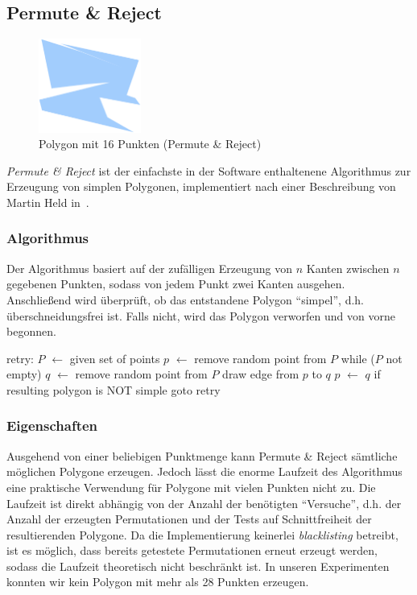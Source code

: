 \subsection{Permute \& Reject}

  \begin{figure}[h]
    \begin{center}
      \includegraphics[width=0.3\textwidth]{img/permute16.eps}
    \end{center}
    \caption{Polygon mit 16 Punkten (Permute \& Reject)}
    \label{fig:permute16}
  \end{figure}

  \emph{Permute \& Reject} ist der einfachste in der Software enthaltenene
  Algorithmus zur Erzeugung von simplen Polygonen, implementiert nach einer
  Beschreibung von Martin Held in~\cite{held98polygons}.

  \subsubsection{Algorithmus}

    Der Algorithmus basiert auf der zufälligen Erzeugung von $n$ Kanten zwischen
    $n$ gegebenen Punkten, sodass von jedem Punkt zwei Kanten ausgehen.
    Anschließend wird überprüft, ob das entstandene Polygon \enquote{simpel},
    d.h. überschneidungsfrei ist. Falls nicht, wird das Polygon verworfen und
    von vorne begonnen.

\begin{code}[caption={Permute \& Reject},label=permutelisting,mathescape=true]
retry:
$P$ $\leftarrow$ given set of points
$p$ $\leftarrow$ remove random point from $P$
while ($P$ not empty)
  $q$ $\leftarrow$ remove random point from $P$
  draw edge from $p$ to $q$
  $p$ $\leftarrow$ $q$
if resulting polygon is NOT simple
  goto retry
\end{code}

  \subsubsection{Eigenschaften}

    Ausgehend von einer beliebigen Punktmenge kann Permute \& Reject sämtliche
    möglichen Polygone erzeugen. Jedoch lässt die enorme Laufzeit des
    Algorithmus eine praktische Verwendung für Polygone mit vielen Punkten
    nicht zu. Die Laufzeit ist direkt abhängig von der Anzahl der benötigten 
    \enquote{Versuche}, d.h. der Anzahl der erzeugten Permutationen und der
    Tests auf Schnittfreiheit der resultierenden Polygone. Da die Implementierung
    keinerlei \emph{blacklisting} betreibt, ist es möglich, dass bereits
    getestete Permutationen erneut erzeugt werden, sodass die Laufzeit theoretisch
    nicht beschränkt ist. In unseren Experimenten konnten wir kein Polygon mit mehr
    als 28 Punkten erzeugen.


